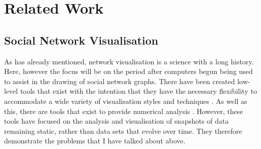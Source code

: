 \documentclass[12pt,a4paper]{article}
\begin{document}
%

\section{Related Work}

\subsection{Social Network Visualisation}
\noindent
As has already mentioned, network visualisation is a science with a long history. Here, however the focus will be on the period after computers begun being used to assist in the drawing of social network graphs. There have been created low-level tools that exist with the intention that they have the necessary flexibility to accommodate a wide variety of visualisation styles and techniques \cite{heer2005prefuse}. As well as this, there are tools that exist to provide numerical analysis \cite{borgatti2002ucinet}. However, these tools have focused on the analysis and visualisation of snapshots of data remaining static, rather than data sets that evolve over time. They therefore demonstrate the problems that I have talked about above.
\end{document}
